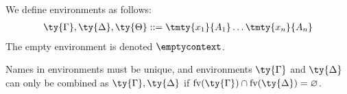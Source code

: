 \begin{definition}[Environments]\label{def:cp-envs}
  We define environments as follows:
  \begin{gather*}
    \ty{\Gamma}, \ty{\Delta}, \ty{\Theta} ::=
    \tmty{x_1}{A_1}\dots\tmty{x_n}{A_n}
  \end{gather*}
  The empty environment is denoted $\emptycontext$.

  Names in environments must be unique, and environments $\ty{\Gamma}$ and
  $\ty{\Delta}$ can only be combined as $\ty{\Gamma}, \ty{\Delta}$ if
  $\text{fv}(\ty{\Gamma}) \cap \text{fv}(\ty{\Delta}) = \varnothing$.
\end{definition}
